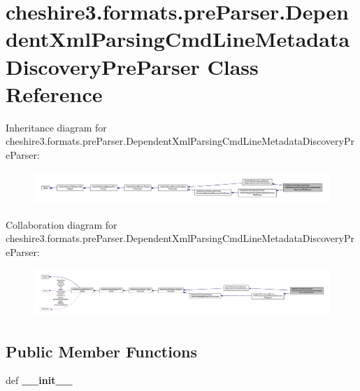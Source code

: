 \hypertarget{classcheshire3_1_1formats_1_1pre_parser_1_1_dependent_xml_parsing_cmd_line_metadata_discovery_pre_parser}{\section{cheshire3.\-formats.\-pre\-Parser.\-Dependent\-Xml\-Parsing\-Cmd\-Line\-Metadata\-Discovery\-Pre\-Parser Class Reference}
\label{classcheshire3_1_1formats_1_1pre_parser_1_1_dependent_xml_parsing_cmd_line_metadata_discovery_pre_parser}
}


Inheritance diagram for cheshire3.\-formats.\-pre\-Parser.\-Dependent\-Xml\-Parsing\-Cmd\-Line\-Metadata\-Discovery\-Pre\-Parser\-:
\nopagebreak
\begin{figure}[H]
\begin{center}
\leavevmode
\includegraphics[width=350pt]{classcheshire3_1_1formats_1_1pre_parser_1_1_dependent_xml_parsing_cmd_line_metadata_discovery_pre_parser__inherit__graph}
\end{center}
\end{figure}


Collaboration diagram for cheshire3.\-formats.\-pre\-Parser.\-Dependent\-Xml\-Parsing\-Cmd\-Line\-Metadata\-Discovery\-Pre\-Parser\-:
\nopagebreak
\begin{figure}[H]
\begin{center}
\leavevmode
\includegraphics[width=350pt]{classcheshire3_1_1formats_1_1pre_parser_1_1_dependent_xml_parsing_cmd_line_metadata_discovery_pre_parser__coll__graph}
\end{center}
\end{figure}
\subsection*{Public Member Functions}
\begin{DoxyCompactItemize}
\item 
\hypertarget{classcheshire3_1_1formats_1_1pre_parser_1_1_dependent_xml_parsing_cmd_line_metadata_discovery_pre_parser_a94bfcaaaf43caa2774b038f302432aea}{def {\bfseries \-\_\-\-\_\-init\-\_\-\-\_\-}}\label{classcheshire3_1_1formats_1_1pre_parser_1_1_dependent_xml_parsing_cmd_line_metadata_discovery_pre_parser_a94bfcaaaf43caa2774b038f302432aea}

\end{DoxyCompactItemize}
